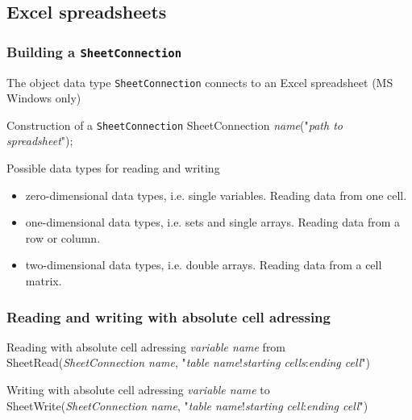 \subsection{Excel spreadsheets}
\begin{frame}
 \frametitle{Building a \texttt{SheetConnection}}
 The object data type \texttt{SheetConnection} connects to an Excel spreadsheet (MS Windows only)
 \begin{block}{Construction of a \texttt{SheetConnection}}
  \ttfamily
  SheetConnection \textsf{\slshape name}("\textsf{\slshape path to spreadsheet}");
 \end{block}
 \begin{block}{Possible data types for reading and writing}
  \begin{itemize}
   \item zero-dimensional data types, i.e. single variables. Reading data from one cell.
   \item one-dimensional data types, i.e. sets and single arrays. Reading data from a row or column.
   \item two-dimensional data types, i.e. double arrays. Reading data from a cell matrix.
  \end{itemize}
 \end{block}
\end{frame}

\begin{frame}
 \frametitle{Reading and writing with absolute cell adressing}
 \begin{block}{Reading with absolute cell adressing}
  \ttfamily
  \textsf{\slshape variable name} from SheetRead(\textsf{\slshape SheetConnection name}, "\textsf{\slshape table name}!\textsf{\slshape starting cells}:\textsf{\slshape ending cell}")
 \end{block}
 \begin{block}{Writing with absolute cell adressing}
  \ttfamily
  \textsf{\slshape variable name} to SheetWrite(\textsf{\slshape SheetConnection name}, "\textsf{\slshape table name}!\textsf{\slshape starting cell}:\textsf{\slshape ending cell}")
 \end{block}
\end{frame}

